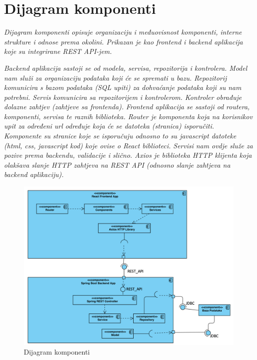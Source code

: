 			
			\section{Dijagram komponenti}
			\textit{Dijagram komponenti opisuje organizaciju i međuovisnost komponenti, interne strukture i odnose prema okolini. Prikazan je kao frontend i backend aplikacija koje su integrirane REST API-jem.}
			
			\textit{Backend aplikacija sastoji se od modela, servisa, repozitorija i kontrolera. Model nam služi za organizaciju podataka koji će se spremati u bazu. Repozitorij komunicira s bazom podataka (SQL upiti) za dohvaćanje podataka koji su nam potrebni. Servis komunicira sa repozitorijem i kontrolerom. Kontroler obrađuje dolazne zahtjev (zahtjeve sa frontenda). }
			\textit{Frontend aplikacija se sastoji od routera, komponenti, servisa te raznih biblioteka. Router je komponenta koja na korisnikov upit za određeni url određuje koja će se datoteka (stranica) isporučiti. Komponente su stranice koje se isporučuju odnosno to su javascript datoteke (html, css, javascript kod) koje ovise o React biblioteci.  Servisi nam ovdje služe za pozive prema backendu, validacije i slično. Axios je biblioteka HTTP klijenta koja olakšava slanje HTTP zahtjeva na REST API (odnosno slanje zahtjeva na backend aplikaciju). }
		
		
			\begin{figure}[H]
				\centering
				\includegraphics[width=\textwidth]{slike/dijagram_komponenti.png}
				\caption{Dijagram komponenti}
				\label{fig:my_label}
			\end{figure}
			
			
			
			
			